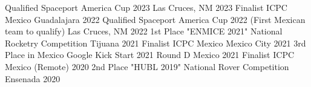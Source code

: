 


\begin{cvhonors}

  \cvhonor
    {Qualified} %
    {Spaceport America Cup 2023} %
    {Las Cruces, NM} %
    {2023} %
  \cvhonor
    {Finalist} %
    {ICPC Mexico} %
    {Guadalajara} %
    {2022} %
  \cvhonor
    {Qualified} %
    {Spaceport America Cup 2022 (First Mexican team to qualify)} %
    {Las Cruces, NM} %
    {2022} %
  \cvhonor
    {1st Place} %
    {"ENMICE 2021" National Rocketry Competition} %
    {Tijuana} %
    {2021} %
  \cvhonor
    {Finalist} %
    {ICPC Mexico} %
    {Mexico City} %
    {2021} %
  \cvhonor
    {3rd Place in Mexico} %
    {Google Kick Start 2021 Round D} %
    {Mexico} %
    {2021} %
  \cvhonor
    {Finalist} %
    {ICPC Mexico} %
    {(Remote)} %
    {2020} %
  \cvhonor
    {2nd Place} %
    {"HUBL 2019" National Rover Competition} %
    {Ensenada} %
    {2020} %
\end{cvhonors}